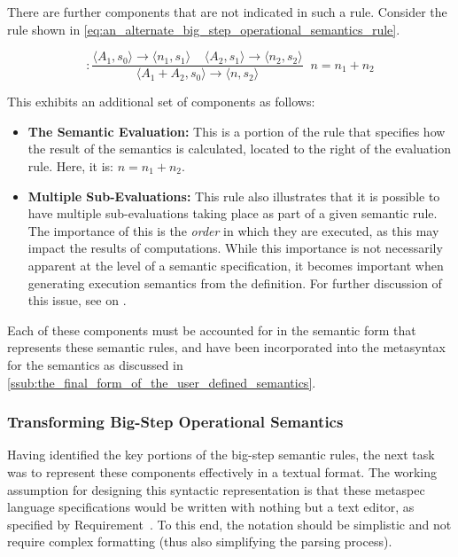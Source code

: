 There are further components that are not indicated in such a rule. 
Consider the rule shown in \autoref{eq:an_alternate_big_step_operational_semantics_rule}.

\begin{equation}
    [+] : \frac{\langle A_1, s_0\rangle \to \langle n_1, s_1\rangle \;\;\;\; \langle A_2, s_1 \rangle \to \langle n_2, s_2\rangle}{\langle A_1 + A_2, s_0 \rangle \to \langle n, s_2 \rangle}\;\; n = n_1 + n_2
    \label{eq:an_alternate_big_step_operational_semantics_rule}
\end{equation}

This exhibits an additional set of components as follows:
\begin{itemize}
    \item \textbf{The Semantic Evaluation:} This is a portion of the rule that specifies how the result of the semantics is calculated, located to the right of the evaluation rule. 
    Here, it is: $n = n_1 + n_2$.
    \item \textbf{Multiple Sub-Evaluations:} This rule also illustrates that it is possible to have multiple sub-evaluations taking place as part of a given semantic rule. 
    The importance of this is the \textit{order} in which they are executed, as this may impact the results of computations.
    While this importance is not necessarily apparent at the level of a semantic specification, it becomes important when generating execution semantics from the definition. 
    For further discussion of this issue, see  on .
\end{itemize}

Each of these components must be accounted for in the semantic form that represents these semantic rules, and have been incorporated into the metasyntax for the semantics as discussed in \autoref{ssub:the_final_form_of_the_user_defined_semantics}.


\subsubsection{Transforming Big-Step Operational Semantics} %
\label{ssub:transforming_big_step_operational_semantics}
Having identified the key portions of the big-step semantic rules, the next task was to represent these components effectively in a textual format. 
The working assumption for designing this syntactic representation is that these \gls{metaspec} language specifications would be written with nothing but a text editor, as specified by Requirement~.
To this end, the notation should be simplistic and not require complex formatting (thus also simplifying the parsing process). \\

